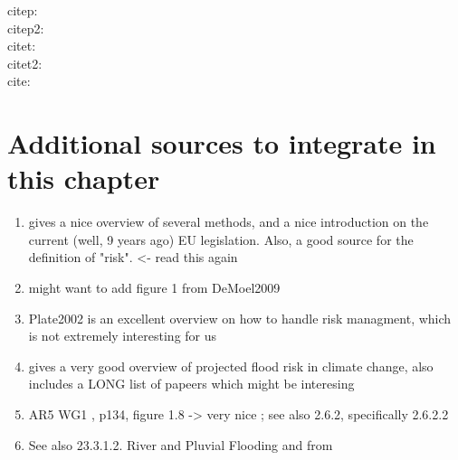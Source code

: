 citep:  \citep{Dankers2009, Alfieri2017}\\
citep2: \citep[come dicono][è tutto fuffa]{Dankers2009, Alfieri2017}\\
citet:  \citet{Dankers2009, Alfieri2017}\\
citet2: \citet[come dicono][è tutto fuffa]{Dankers2009, Alfieri2017}\\
cite:   \cite{Dankers2009, Alfieri2017}\\






\section{Additional sources to integrate in this chapter}
\begin{enumerate}
    \item \citet{DeMoel2009} gives a nice overview of several methods, and a nice introduction on the current (well, 9 years ago) EU legislation. Also, a good source for the definition of "risk". <- read this again
    \item might want to add figure 1 from DeMoel2009
    \item Plate2002 is an excellent overview on how to handle risk managment, which is not extremely interesting for us
    \item \citet{Arnell2016} gives a very good overview of projected flood risk in climate change, also includes a LONG list of papeers which might be interesing
    \item AR5 WG1 \citep{IPCC2013}, p134, figure 1.8 -> very nice ; see also 2.6.2, specifically 2.6.2.2
    \item See also 23.3.1.2. River and Pluvial Flooding and from \citet{Aalst2014}
\end{enumerate}
